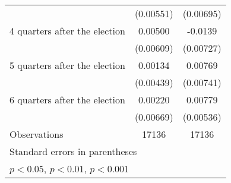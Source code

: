 \begin{table}[htbp]
\begin{tabular}{l*{2}{c}}
                    &   (0.00551)         &   (0.00695)         \\
[1em]
 4 quarters after the election&     0.00500         &     -0.0139         \\
                    &   (0.00609)         &   (0.00727)         \\
[1em]
 5 quarters after the election&     0.00134         &     0.00769         \\
                    &   (0.00439)         &   (0.00741)         \\
[1em]
 6 quarters after the election&     0.00220         &     0.00779         \\
                    &   (0.00669)         &   (0.00536)         \\
\hline
Observations        &       17136         &       17136         \\
\hline\hline
\multicolumn{3}{l}{\footnotesize Standard errors in parentheses}\\
\multicolumn{3}{l}{\footnotesize \sym{*} \(p<0.05\), \sym{**} \(p<0.01\), \sym{***} \(p<0.001\)}\\
\end{tabular}
\end{table}
